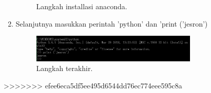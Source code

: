 \begin{enumerate}
\begin{figure}[ht]
\caption{Langkah installasi anaconda.}
\end{figure}
\item  Selanjutnya masukkan perintah 'python' dan 'print ('jesron')
\begin{figure}[ht]
\centerline{\includegraphics[width=0.75\textwidth]{figures/4.JPEG}}
\caption{Langkah terakhir.}
\end{figure}
\end{enumerate}
>>>>>>> efee6eca5df5ee495d6544dd76ec774eee595c8a
